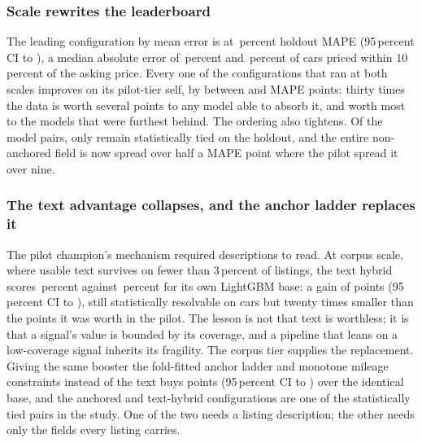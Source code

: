\documentclass[journal,10pt]{IEEEtran}
\begin{document}
\subsubsection{Scale rewrites the leaderboard} The leading configuration by mean error is \ChampionName{} at \ChampionMape\,percent holdout MAPE (95\,percent CI \ChampionCILow{} to \ChampionCIHigh), a median absolute error of \ChampionMedian\,percent and \ChampionWithin\,percent of cars priced within 10\,percent of the asking price. Every one of the \ScaleGainModels{} configurations that ran at both scales improves on its pilot-tier self, by between \ScaleGainMin{} and \ScaleGainMax{} MAPE points: thirty times the data is worth several points to any model able to absorb it, and worth most to the models that were furthest behind. The ordering also tightens. Of the \TotalPairs{} model pairs, only \TiedPairs{} remain statistically tied on the holdout, and the entire non-anchored field is now spread over half a MAPE point where the pilot spread it over nine.

\subsubsection{The text advantage collapses, and the anchor ladder replaces it} The pilot champion's mechanism required descriptions to read. At corpus scale, where usable text survives on fewer than 3\,percent of listings, the text hybrid scores \TextHybridMape\,percent against \LgbmMape\,percent for its own LightGBM base: a gain of \TextGain{} points (95\,percent CI \TextGainCILow{} to \TextGainCIHigh), still statistically resolvable on \NHoldout{} cars but twenty times smaller than the \PilotTextGain{} points it was worth in the pilot. The lesson is not that text is worthless; it is that a signal's value is bounded by its coverage, and a pipeline that leans on a low-coverage signal inherits its fragility. The corpus tier supplies the replacement. Giving the same booster the fold-fitted anchor ladder and monotone mileage constraints instead of the text buys \AnchorGain{} points (95\,percent CI \AnchorGainCILow{} to \AnchorGainCIHigh) over the identical base, and the anchored and text-hybrid configurations are one of the \TiedPairs{} statistically tied pairs in the study. One of the two needs a listing description; the other needs only the fields every listing carries.
\end{document}
